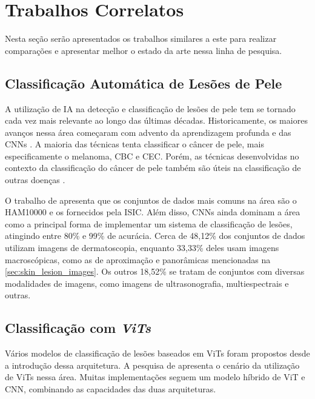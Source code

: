 \chapter{Trabalhos Correlatos} %

Nesta seção serão apresentados os trabalhos similares a este para realizar comparações e apresentar melhor o estado da
arte nessa linha de pesquisa.

\section{Classificação Automática de Lesões de Pele}

A utilização de \ac{IA} na detecção e classificação de lesões de pele tem se tornado cada vez mais relevante ao longo
das últimas décadas. Historicamente, os maiores avanços nessa área começaram com advento da aprendizagem profunda e das
\acp{CNN} \cite{li2019artificial}. A maioria das técnicas tenta classificar o câncer de pele, mais especificamente o
melanoma, \ac{CBC} e \ac{CEC}. Porém, as técnicas desenvolvidas no contexto da classificação do câncer de pele também
são úteis na classificação de outras doenças \cite{okuboyejo2018review}.

O trabalho de \textcite{skin_cancer_ai} apresenta que os conjuntos de dados mais comuns na área são o \ac{HAM10000} e
os fornecidos pela \ac{ISIC}. Além disso, \acp{CNN} ainda dominam a área como a principal forma de implementar um
sistema de classificação de lesões, atingindo entre 80\% e 99\% de acurácia. Cerca de 48,12\% dos conjuntos de dados
utilizam imagens de dermatoscopia, enquanto 33,33\% deles usam imagens macroscópicas, como as de aproximação e
panorâmicas mencionadas na \autoref{sec:skin_lesion_images}. Os outros 18,52\% se tratam de conjuntos com diversas
modalidades de imagens, como imagens de ultrasonografia, multiespectrais e outras.

\section{Classificação com \textit{ViTs}}

Vários modelos de classificação de lesões baseados em \acp{ViT} foram propostos desde a introdução dessa arquitetura. A
pesquisa de \textcite{khan2023identifying} apresenta o cenário da utilização de \acp{ViT} nessa área. Muitas
implementações seguem um modelo híbrido de \ac{ViT} e \ac{CNN}, combinando as capacidades das duas arquiteturas.

